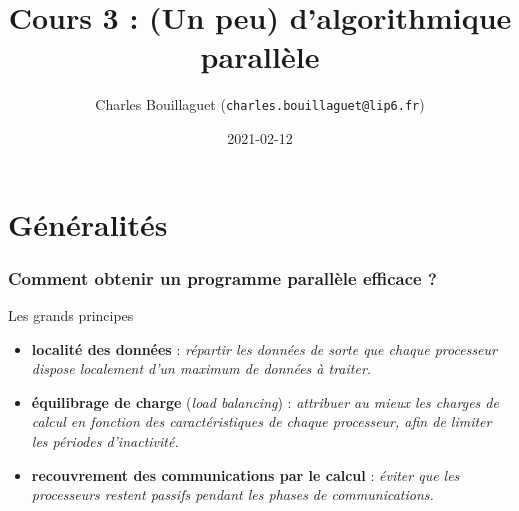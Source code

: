 \documentclass[xcolor={x11names,svgnames}]{beamer}
\author[C.~Bouillaguet]{Charles Bouillaguet \newline
  {\small (\texttt{charles.bouillaguet@lip6.fr})}}
\title{Cours 3 : (Un peu) d'algorithmique parallèle}
\date{2021-02-12}
\begin{document}
\begin{frame}[label=title]
  \titlepage
\end{frame}

\section{Généralités}

\begin{frame}
\frametitle{Comment obtenir un programme parallèle efficace ?}

\begin{block}{Les grands principes}

\begin{itemize}
\item {\bf localité des données} : {\it répartir les données de sorte que
  chaque processeur dispose localement d'un maximum de données à traiter.}

\medskip

\item {\bf équilibrage de charge} ({\it load balancing}) : {\it attribuer au mieux les charges de
  calcul en fonction des caractéristiques de chaque processeur, afin
  de limiter les périodes d'inactivité.}

\medskip

\item {\bf recouvrement des communications par le calcul} : {\it éviter que les
    processeurs restent passifs pendant les phases de communications.}
\end{itemize}
\end{block}

\end{frame}
\end{document}
